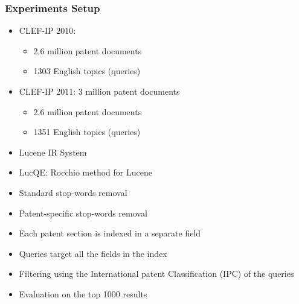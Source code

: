 \documentclass[xcolor=x11names,compress]{beamer}
\renewcommand{\(}{\begin{columns}}
\renewcommand{\)}{\end{columns}}
\newcommand{\<}[1]{\begin{column}{#1}}
\renewcommand{\>}{\end{column}}
\begin{document}
\begin{frame}
\frametitle{Experiments Setup}
\begin{itemize}
\item CLEF-IP 2010: 
	\begin{itemize}
		\item 2.6 million patent documents
		\item 1303 English topics (queries)
	\end{itemize}
\item CLEF-IP 2011: 3 million patent documents
	\begin{itemize}
		\item 2.6 million patent documents
		\item 1351 English topics (queries)
	\end{itemize}
\item Lucene IR System
\item LucQE: Rocchio method for Lucene
\item Standard stop-words removal
\item Patent-specific stop-words removal \cite{Magdy2012}
\item Each patent section is indexed in a separate field
\item Queries target all the fields in the index
\item Filtering using the International patent Classification (IPC) of the queries \cite{Lopez2009,Roda2009}
\item Evaluation on the top 1000 results
\end{itemize}

\end{frame}
\end{document}
